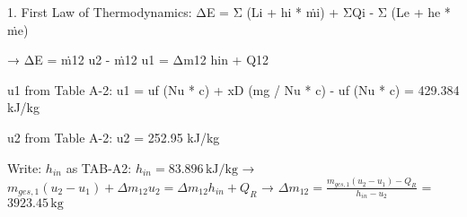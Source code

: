 1. First Law of Thermodynamics:  
ΔE = Σ (Li + hi * ṁi) + ΣQi - Σ (Le + he * ṁe)  

→ ΔE = ṁ12 u2 - ṁ12 u1 = Δm12 hin + Q12  

u1 from Table A-2: u1 = uf (Nu * c) + xD (mg / Nu * c) - uf (Nu * c)  
= 429.384 kJ/kg  

u2 from Table A-2: u2 = 252.95 kJ/kg

Write: \( h_{in} \) as TAB-A2: \( h_{in} = 83.896 \, \text{kJ/kg} \)  
→ \( m_{ges,1} (u_2 - u_1) + \Delta m_{12} u_2 = \Delta m_{12} h_{in} + Q_{R} \)  
→ \( \Delta m_{12} = \frac{m_{ges,1} (u_2 - u_1) - Q_{R}}{h_{in} - u_2} \)  
= \( 3923.45 \, \text{kg} \)